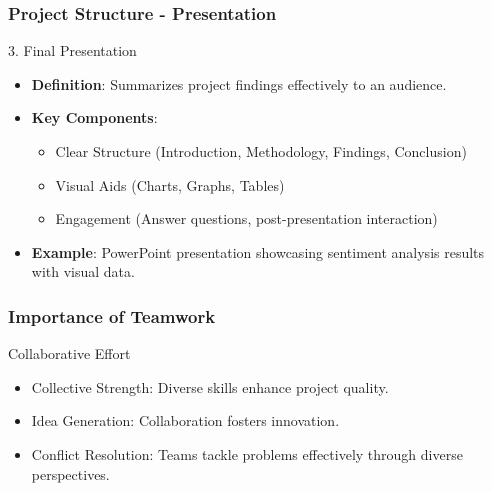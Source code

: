 \documentclass[aspectratio=169]{beamer}
\begin{document}
\begin{frame}[fragile]
    \frametitle{Project Structure - Presentation}
    \begin{block}{3. Final Presentation}
        \begin{itemize}
            \item \textbf{Definition}: Summarizes project findings effectively to an audience.
            \item \textbf{Key Components}:
            \begin{itemize}
                \item Clear Structure (Introduction, Methodology, Findings, Conclusion)
                \item Visual Aids (Charts, Graphs, Tables)
                \item Engagement (Answer questions, post-presentation interaction)
            \end{itemize}
            \item \textbf{Example}: PowerPoint presentation showcasing sentiment analysis results with visual data.
        \end{itemize}
    \end{block}
\end{frame}

\begin{frame}[fragile]
    \frametitle{Importance of Teamwork}
    \begin{block}{Collaborative Effort}
        \begin{itemize}
            \item Collective Strength: Diverse skills enhance project quality.
            \item Idea Generation: Collaboration fosters innovation.
            \item Conflict Resolution: Teams tackle problems effectively through diverse perspectives.
        \end{itemize}
    \end{block}
\end{frame}
\end{document}
